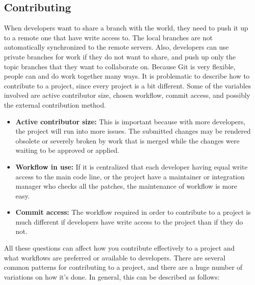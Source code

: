 \documentclass[draftclsnofoot,journal,onecolumn,12pt]{IEEEtran}
\begin{document}
\subsection{Contributing}
When developers want to share a branch with the world, they need to push it up to a remote one that have write access to. The local branches are not automatically synchronized to the remote servers. Also, developers can use private branches for work if they do not want to share, and push up only the topic branches that they want to collaborate on. Because Git is very flexible, people can and do work together many ways. It is problematic to describe how to contribute to a project, since every project is a bit different. Some of the variables involved are active contributor size, chosen workflow, commit access, and possibly the external contribution method.
\begin{itemize}
  \item \textbf{Active contributor size:} This is important because with more developers, the project will run into more issues. The submitted changes may be rendered obsolete or severely broken by work that is merged while the changes were waiting to be approved or applied.
  \item \textbf{Workflow in use:} If it is centralized that each developer having equal write access to the main code line, or the project have a maintainer or integration manager who checks all the patches, the maintenance of workflow is more easy.
  \item \textbf{Commit access:} The workflow required in order to contribute to a project is much different if developers have write access to the project than if they do not.
\end{itemize}

All these questions can affect how you contribute effectively to a project and what workflows are preferred or available to developers. There are several common patterns for contributing to a project, and there are a huge number of variations on how it’s done. In general, this can be described as follows:
\end{document}
